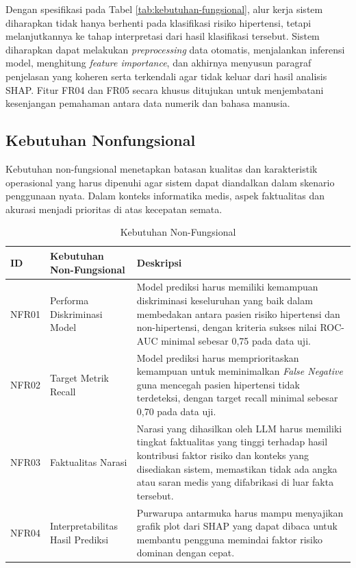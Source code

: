 Dengan spesifikasi pada Tabel \ref{tab:kebutuhan-fungsional}, alur kerja sistem diharapkan tidak hanya berhenti pada klasifikasi risiko hipertensi, tetapi melanjutkannya ke tahap interpretasi dari hasil klasifikasi tersebut. Sistem diharapkan dapat melakukan \emph{preprocessing} data otomatis, menjalankan inferensi model, menghitung \emph{feature importance}, dan akhirnya menyusun paragraf penjelasan yang koheren serta terkendali agar tidak keluar dari hasil analisis SHAP. Fitur FR04 dan FR05 secara khusus ditujukan untuk menjembatani kesenjangan pemahaman antara data numerik dan bahasa manusia.

\subsection{Kebutuhan Nonfungsional}
Kebutuhan non-fungsional menetapkan batasan kualitas dan karakteristik operasional yang harus dipenuhi agar sistem dapat diandalkan dalam skenario penggunaan nyata. Dalam konteks informatika medis, aspek faktualitas dan akurasi menjadi prioritas di atas kecepatan semata.

\begin{table}[H]
    \caption{Kebutuhan Non-Fungsional}
    \label{tab:kebutuhan-nonfungsional}
    \centering
    \small
    \begin{tabular}{|p{1.5cm}|p{4.5cm}|p{7.5cm}|}
        \hline
        \textbf{ID} & \textbf{Kebutuhan Non-Fungsional} & \textbf{Deskripsi} \\
        \hline
        NFR01 & Performa Diskriminasi Model & Model prediksi harus memiliki kemampuan diskriminasi keseluruhan yang baik dalam membedakan antara pasien risiko hipertensi dan non-hipertensi, dengan kriteria sukses nilai ROC-AUC minimal sebesar 0,75 pada data uji. \\
        \hline
        NFR02 & Target Metrik Recall & Model prediksi harus memprioritaskan kemampuan untuk meminimalkan \emph{False Negative} guna mencegah pasien hipertensi tidak terdeteksi, dengan target recall minimal sebesar 0,70 pada data uji. \\
        \hline
        NFR03 & Faktualitas Narasi & Narasi yang dihasilkan oleh LLM harus memiliki tingkat faktualitas yang tinggi terhadap hasil kontribusi faktor risiko dan konteks yang disediakan sistem, memastikan tidak ada angka atau saran medis yang difabrikasi di luar fakta tersebut. \\
        \hline
        NFR04 & Interpretabilitas Hasil Prediksi & Purwarupa antarmuka harus mampu menyajikan grafik plot dari SHAP yang dapat dibaca untuk membantu pengguna memindai faktor risiko dominan dengan cepat. \\
        \hline
    \end{tabular}
\end{table}

